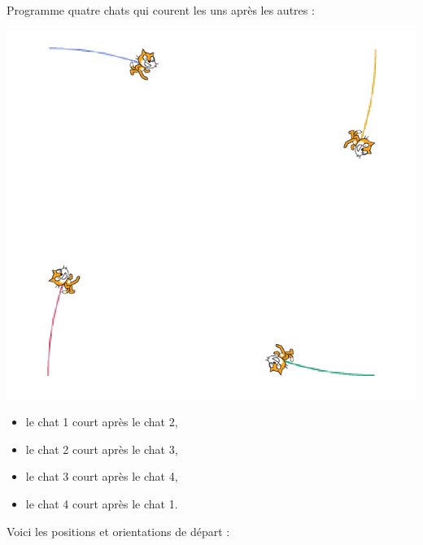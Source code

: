 \documentclass[class=report,crop=false, 12pt]{standalone}
\begin{document}




\bigskip
\bigskip

\begin{activite}


Programme quatre chats qui courent les uns après les autres :

\begin{center}
  \includegraphics[scale=\scaleecran]{ecran-08-ex1} 
\end{center}

\begin{itemize}
  \item le chat 1 court après le chat 2,
  \item le chat 2 court après le chat 3,
  \item le chat 3 court après le chat 4,
  \item le chat 4 court après le chat 1.
\end{itemize}

\bigskip

Voici les positions et orientations de départ :


\end{activite}
\end{document}
